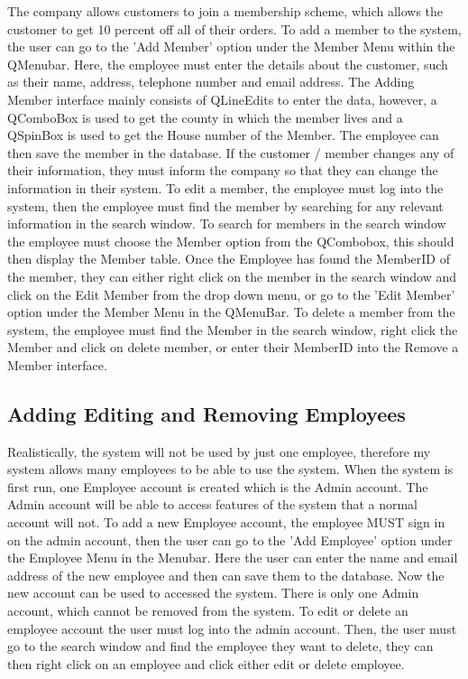 The company allows customers to join a membership scheme, which allows the customer to get 10 percent off all of their orders. To add a member to the system, the user can go to the 'Add Member' option under the Member Menu within the QMenubar. Here, the employee must enter the details about the customer, such as their name, address, telephone number and email address. The Adding Member interface mainly consists of QLineEdits to enter the data, however, a QComboBox is used to get the county in which the member lives and a QSpinBox is used to get the House number of the Member. The employee can then save the member in the database. If the customer / member changes any of their information, they must inform the company so that they can change the information in their system. To edit a member, the employee must log into the system, then the employee must find the member by searching for any relevant information in the search window. To search for members in the search window the employee must choose the Member option from the QCombobox, this should then display the Member table. Once the Employee has found the MemberID of the member, they can either right click on the member in the search window and click on the Edit Member from the drop down menu, or go to the 'Edit Member' option under the Member Menu in the QMenuBar. To delete a member from the system, the employee must find the Member in the search window, right click the Member and click on delete member, or enter their MemberID into the Remove a Member interface.

\subsection{Adding Editing and Removing Employees}
Realistically, the system will not be used by just one employee, therefore my system allows many employees to be able to use the system. When the system is first run, one Employee account is created which is the Admin account. The Admin account will be able to access features of the system that a normal account will not. To add a new Employee account, the employee MUST sign in on the admin account, then the user can go to the 'Add Employee' option under the Employee Menu in the Menubar. Here the user can enter the name and email address of the new employee and then can save them to the database. Now the new account can be used to accessed the system. There is only one Admin account, which cannot be removed from the system.
To edit or delete an employee account the user must log into the admin account. Then, the user must go to the search window and find the employee they want to delete, they can then right click on an employee and click either edit or delete employee.


